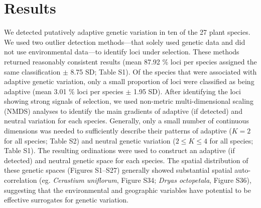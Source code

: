 \documentclass[9pt,twocolumn,twoside,lineno]{pnas-new}
\begin{document}
\section*{Results}\label{results}

We detected putatively adaptive genetic variation in ten of the 27 plant
species. We used two outlier detection methods---that solely used
genetic data and did not use environmental data---to identify loci under
selection. These methods returned reasonably consistent results (mean
87.92 \% loci per species assigned the same classification \(\pm\) 8.75
SD; Table S1). Of the species that were associated with adaptive genetic
variation, only a small proportion of loci were classified as being
adaptive (mean 3.01 \% loci per species \(\pm\) 1.95 SD). After
identifying the loci showing strong signals of selection, we used
non-metric multi-dimensional scaling (NMDS) analyses to identify the
main gradients of adaptive (if detected) and neutral variation for each
species. Generally, only a small number of continuous dimensions was
needed to sufficiently describe their patterns of adaptive (\(K = 2\)
for all species; Table S2) and neutral genetic variation
(\(2 \leq K \leq 4\) for all species; Table S1). The resulting
ordinations were used to construct an adaptive (if detected) and neutral
genetic space for each species. The spatial distribution of these
genetic spaces (Figures S1--S27) generally showed substantial spatial
auto-correlation (eg. \emph{Cerastium uniflorum}, Figure S34;
\emph{Dryas octopetala}, Figure S36), suggesting that the environmental
and geographic variables have potential to be effective surrogates for
genetic variation.
\end{document}
